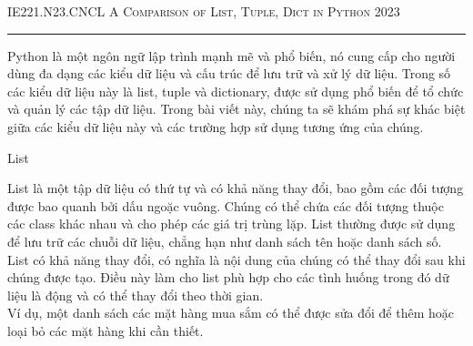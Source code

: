 \documentclass[12pt]{amsart}
\begin{document}
\thispagestyle{empty}

{\scshape IE221.N23.CNCL} \hfill {\scshape \large A Comparison of List, Tuple, Dict in Python} \hfill {\scshape 2023}
 
\smallskip

\hrule

\bigskip
Python là một ngôn ngữ lập trình mạnh mẽ và phổ biến, nó cung cấp cho người dùng đa dạng các kiểu dữ liệu và cấu trúc để lưu trữ và xử lý dữ liệu. Trong số các kiểu dữ liệu này là list, tuple và dictionary, được sử dụng phổ biến để tổ chức và quản lý các tập dữ liệu. Trong bài viết này, chúng ta sẽ khám phá sự khác biệt giữa các kiểu dữ liệu này và các trường hợp sử dụng tương ứng của chúng.
\bigskip

\bigskip

\begin{section}{List}

    List là một tập dữ liệu có thứ tự và có khả năng thay đổi, bao gồm các đối tượng được bao quanh bởi dấu ngoặc vuông. Chúng có thể chứa các đối tượng thuộc các class khác nhau và cho phép các giá trị trùng lặp. List thường được sử dụng để lưu trữ các chuỗi dữ liệu, chẳng hạn như danh sách tên hoặc danh sách số. List có khả năng thay đổi, có nghĩa là nội dung của chúng có thể thay đổi sau khi chúng được tạo. Điều này làm cho list phù hợp cho các tình huống trong đó dữ liệu là động và có thể thay đổi theo thời gian.  \\


    Ví dụ, một danh sách các mặt hàng mua sắm có thể được sửa đổi để thêm hoặc loại bỏ các mặt hàng khi cần thiết.

\end{section}
\end{document}
